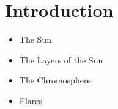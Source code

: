 \chapter{Introduction}

\begin{itemize}
    \item The Sun
    \item The Layers of the Sun
    \item The Chromosphere
    \item Flares
\end{itemize}



